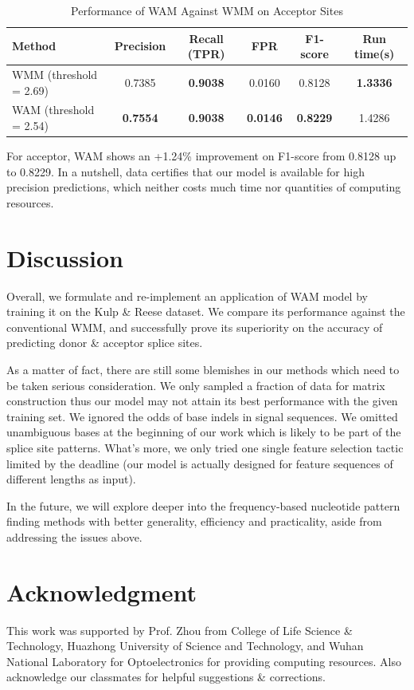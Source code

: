 \documentclass[journal,twoside]{IEEEtran}
\begin{document}
\begin{table}[htbp]
\begin{center}
\begin{threeparttable}
\caption{Performance of WAM Against WMM on Acceptor Sites}
\begin{tabular}{lccccc}
\toprule
Method & Precision & Recall (TPR) & FPR & F1-score & Run time(s) \\
\midrule
WMM (threshold = 2.69) & 0.7385 & \textbf{0.9038} & 0.0160 & 0.8128 & \textbf{1.3336} \\
WAM (threshold = 2.54) & \textbf{0.7554} & \textbf{0.9038} & \textbf{0.0146} &  \textbf{0.8229} & 1.4286 \\
\bottomrule
\end{tabular}
\label{tab2}
\end{threeparttable}
\end{center}
\end{table}

For acceptor, WAM shows an +1.24\% improvement on F1-score from 0.8128 up to 0.8229. In a nutshell, data certifies that our model is available for high precision predictions, which neither costs much time nor quantities of computing resources. 

\section{Discussion}

Overall, we formulate and re-implement an application of WAM model by training it on the Kulp \& Reese dataset. We compare its performance against the conventional WMM, and successfully prove its superiority on the accuracy of predicting donor \& acceptor splice sites. 

As a matter of fact, there are still some blemishes in our methods which need to be taken serious consideration. We only sampled a fraction of data for matrix construction thus our model may not attain its best performance with the given training set. We ignored the odds of base indels in signal sequences. We omitted unambiguous bases at the beginning of our work which is likely to be part of the splice site patterns. What's more, we only tried one single feature selection tactic limited by the deadline (our model is actually designed for feature sequences of different lengths as input). 

In the future, we will explore deeper into the frequency-based nucleotide pattern finding methods with better generality, efficiency and practicality, aside from addressing the issues above. 

\section*{Acknowledgment}

This work was supported by Prof. Zhou from College of Life Science \& Technology, Huazhong University of Science and Technology, and Wuhan National Laboratory for Optoelectronics for providing computing resources. Also acknowledge our classmates for helpful suggestions \& corrections. 



\end{document}
